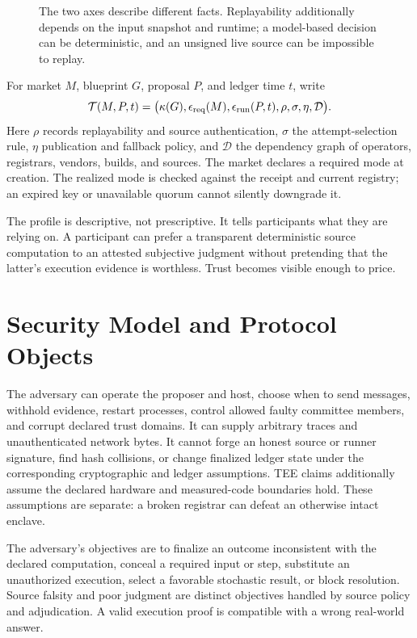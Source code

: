 \begin{figure}[t]
\centering
\resizebox{0.98\linewidth}{!}{}
\caption{The two axes describe different facts. Replayability additionally depends on the input snapshot and runtime; a model-based decision can be deterministic, and an unsigned live source can be impossible to replay.}
\label{fig:twoaxis}
\end{figure}

For market $M$, blueprint $G$, proposal $P$, and ledger time $t$, write
\[
\mathcal T(M,P,t)=\bigl(\kappa(G),\epsilon_{\rm req}(M),
\epsilon_{\rm run}(P,t),\rho,\sigma,\eta,\mathcal D\bigr).
\]
Here $\rho$ records replayability and source authentication, $\sigma$ the attempt-selection rule, $\eta$ publication and fallback policy, and $\mathcal D$ the dependency graph of operators, registrars, vendors, builds, and sources. The market declares a required mode at creation. The realized mode is checked against the receipt and current registry; an expired key or unavailable quorum cannot silently downgrade it.

The profile is descriptive, not prescriptive. It tells participants what they are relying on. A participant can prefer a transparent deterministic source computation to an attested subjective judgment without pretending that the latter's execution evidence is worthless. Trust becomes visible enough to price.

\section{Security Model and Protocol Objects}
\label{sec:model}

The adversary can operate the proposer and host, choose when to send messages, withhold evidence, restart processes, control allowed faulty committee members, and corrupt declared trust domains. It can supply arbitrary traces and unauthenticated network bytes. It cannot forge an honest source or runner signature, find hash collisions, or change finalized ledger state under the corresponding cryptographic and ledger assumptions. TEE claims additionally assume the declared hardware and measured-code boundaries hold. These assumptions are separate: a broken registrar can defeat an otherwise intact enclave.

The adversary's objectives are to finalize an outcome inconsistent with the declared computation, conceal a required input or step, substitute an unauthorized execution, select a favorable stochastic result, or block resolution. Source falsity and poor judgment are distinct objectives handled by source policy and adjudication. A valid execution proof is compatible with a wrong real-world answer.


